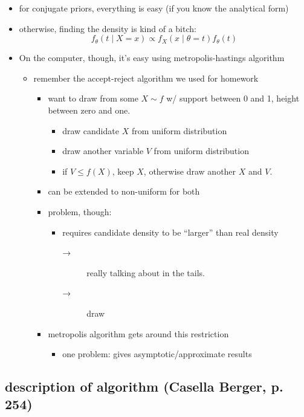 \documentclass[11pt]{article}
\begin{document}
\begin{itemize}
\item for conjugate priors, everything is easy (if you know the analytical form)
\item otherwise, finding the density is kind of a bitch:
      \[f_\theta(t \mid X = x) \propto f_X(x \mid \theta = t) f_\theta(t)\]
\item On the computer, though, it's easy using metropolis-hastings algorithm
\begin{itemize}
\item remember the accept-reject algorithm we used for homework
\begin{itemize}
\item want to draw from some $X \sim f$ w/ support between 0 and 1,
         height between zero and one.
\begin{itemize}
\item draw candidate $X$ from uniform distribution
\item draw another variable $V$ from uniform distribution
\item if $V \leq f(X)$, keep $X$, otherwise draw another $X$ and $V$.
\end{itemize}
\item can be extended to non-uniform for both
\item problem, though:
\begin{itemize}
\item requires candidate density to be ``larger'' than real density
\begin{description}
\item[→] really talking about in the tails.
\item[→] draw
\end{description}
\end{itemize}
\item metropolis algorithm gets around this restriction
\begin{itemize}
\item one problem: gives asymptotic/approximate results
\end{itemize}
\end{itemize}
\end{itemize}
\end{itemize}
\subsection{description of algorithm (Casella Berger, p. 254)}
\label{sec-3-1}
\end{document}
